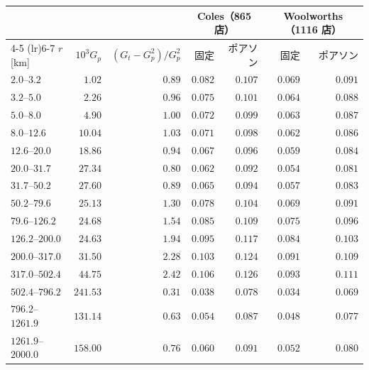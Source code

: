 \begin{tabular}{lrrrrrr}
\toprule
& & & \multicolumn{2}{c}{Coles（865 店）} & \multicolumn{2}{c}{Woolworths（1116 店）} \\
\cmidrule(lr){4-5} \cmidrule(lr){6-7}
$r$ [km] & $10^3 G_p$ & $(G_t - G_p^2)/G_p^2$ & 固定 & ポアソン & 固定 & ポアソン \\
\midrule
$2.0$--$3.2$ & $1.02$ & $0.89$ & $0.082$ & $0.107$ & $0.069$ & $0.091$ \\
$3.2$--$5.0$ & $2.26$ & $0.96$ & $0.075$ & $0.101$ & $0.064$ & $0.088$ \\
$5.0$--$8.0$ & $4.90$ & $1.00$ & $0.072$ & $0.099$ & $0.063$ & $0.087$ \\
$8.0$--$12.6$ & $10.04$ & $1.03$ & $0.071$ & $0.098$ & $0.062$ & $0.086$ \\
$12.6$--$20.0$ & $18.86$ & $0.94$ & $0.067$ & $0.096$ & $0.059$ & $0.084$ \\
$20.0$--$31.7$ & $27.34$ & $0.80$ & $0.062$ & $0.092$ & $0.054$ & $0.081$ \\
$31.7$--$50.2$ & $27.60$ & $0.89$ & $0.065$ & $0.094$ & $0.057$ & $0.083$ \\
$50.2$--$79.6$ & $25.13$ & $1.30$ & $0.078$ & $0.104$ & $0.069$ & $0.091$ \\
$79.6$--$126.2$ & $24.68$ & $1.54$ & $0.085$ & $0.109$ & $0.075$ & $0.096$ \\
$126.2$--$200.0$ & $24.63$ & $1.94$ & $0.095$ & $0.117$ & $0.084$ & $0.103$ \\
$200.0$--$317.0$ & $31.50$ & $2.28$ & $0.103$ & $0.124$ & $0.091$ & $0.109$ \\
$317.0$--$502.4$ & $44.75$ & $2.42$ & $0.106$ & $0.126$ & $0.093$ & $0.111$ \\
$502.4$--$796.2$ & $241.53$ & $0.31$ & $0.038$ & $0.078$ & $0.034$ & $0.069$ \\
$796.2$--$1261.9$ & $131.14$ & $0.63$ & $0.054$ & $0.087$ & $0.048$ & $0.077$ \\
$1261.9$--$2000.0$ & $158.00$ & $0.76$ & $0.060$ & $0.091$ & $0.052$ & $0.080$ \\
\bottomrule
\end{tabular}
